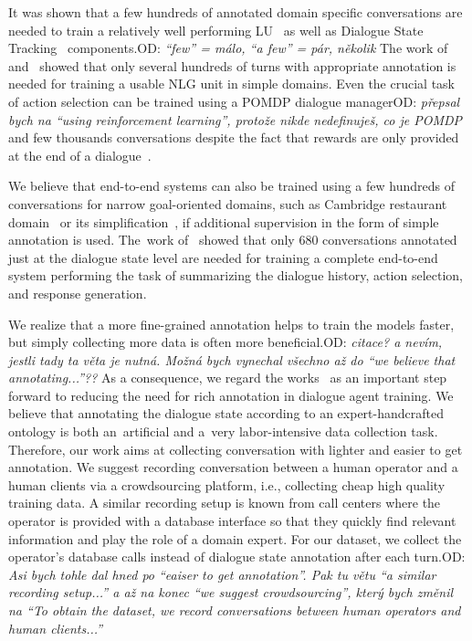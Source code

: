 \documentclass[runningheads,a4paper]{llncs}
\def\OD#1{{\color{darkgreen}OD: \it #1}}
\begin{document}
It was shown that a few hundreds of annotated domain specific conversations are needed to train a relatively well performing LU~\cite{jurvcivcek2014factored} as well as Dialogue State Tracking~\cite{young2010hidden} components.\OD{“few” = málo, “a few” = pár, několik}
The work of~\cite{duvsek2016sequence} and~\cite{mairesse2010phrase} showed that only several hundreds of turns with appropriate annotation is needed for training a usable NLG unit in simple domains.
Even the crucial task of action selection can be trained using a POMDP dialogue manager\OD{přepsal bych na “using reinforcement learning”, protože nikde nedefinuješ, co je POMDP} and few thousands conversations despite the fact that rewards are only provided at the end of a dialogue~\cite{gasic2011line}.

We believe that end-to-end systems can also be trained using a few hundreds of conversations for narrow goal-oriented domains, such as Cambridge restaurant domain~\cite{henderson2014dstc2} or its simplification~\cite{wen2016network}, if additional supervision in the form of simple annotation is used.
The~work of~\cite{wen2016network} showed that only 680 conversations annotated just at the dialogue state level are needed for training a complete end-to-end system performing the task of summarizing the dialogue history, action selection, and response generation.

We realize that a more fine-grained annotation helps to train the models faster, but simply collecting more data is often more beneficial.\OD{citace? a nevím, jestli tady ta věta je nutná. Možná bych vynechal všechno až do “we believe that annotating...”??}
As a consequence, we regard the works~\cite{wen2016network,bordes2016learning,williams2016end} as an important step forward to reducing the need for rich annotation in dialogue agent training.
We believe that annotating the dialogue state according to an expert-handcrafted ontology is both an~artificial and a~very labor-intensive data collection task. Therefore, our work aims at collecting conversation with lighter and easier to get annotation.
We suggest recording conversation between a human operator and a human clients via a crowdsourcing platform, i.e., collecting cheap high quality training data.
A similar recording setup is known from call centers where the operator is provided with a database interface so that they quickly find relevant information and play the role of a domain expert.
For our dataset, we collect the operator's database calls instead of dialogue state annotation after each turn.\OD{Asi bych tohle dal hned po “eaiser to get annotation”. Pak tu větu “a similar recording setup...” a až na konec “we suggest crowdsourcing”, který bych změnil na “To obtain the dataset, we record conversations between human operators and human clients...”}
\end{document}
